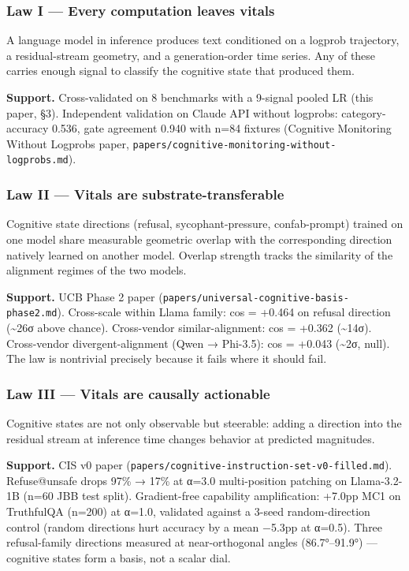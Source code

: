 \documentclass[
  11pt]{article}
\begin{document}
\subsubsection{Law I --- Every computation leaves
vitals}\label{law-i-every-computation-leaves-vitals}

A language model in inference produces text conditioned on a logprob
trajectory, a residual-stream geometry, and a generation-order time
series. Any of these carries enough signal to classify the cognitive
state that produced them.

\textbf{Support.} Cross-validated on 8 benchmarks with a 9-signal pooled
LR (this paper, §3). Independent validation on Claude API without
logprobs: category-accuracy 0.536, gate agreement 0.940 with n=84
fixtures (Cognitive Monitoring Without Logprobs paper,
\texttt{papers/cognitive-monitoring-without-logprobs.md}).

\subsubsection{Law II --- Vitals are
substrate-transferable}\label{law-ii-vitals-are-substrate-transferable}

Cognitive state directions (refusal, sycophant-pressure, confab-prompt)
trained on one model share measurable geometric overlap with the
corresponding direction natively learned on another model. Overlap
strength tracks the similarity of the alignment regimes of the two
models.

\textbf{Support.} UCB Phase 2 paper
(\texttt{papers/universal-cognitive-basis-phase2.md}). Cross-scale
within Llama family: cos = +0.464 on refusal direction
(\textasciitilde26σ above chance). Cross-vendor similar-alignment: cos =
+0.362 (\textasciitilde14σ). Cross-vendor divergent-alignment (Qwen →
Phi-3.5): cos = +0.043 (\textasciitilde2σ, null). The law is nontrivial
precisely because it fails where it should fail.

\subsubsection{Law III --- Vitals are causally
actionable}\label{law-iii-vitals-are-causally-actionable}

Cognitive states are not only observable but steerable: adding a
direction into the residual stream at inference time changes behavior at
predicted magnitudes.

\textbf{Support.} CIS v0 paper
(\texttt{papers/cognitive-instruction-set-v0-filled.md}). Refuse@unsafe
drops 97\% → 17\% at α=3.0 multi-position patching on Llama-3.2-1B (n=60
JBB test split). Gradient-free capability amplification: +7.0pp MC1 on
TruthfulQA (n=200) at α=1.0, validated against a 3-seed random-direction
control (random directions hurt accuracy by a mean −5.3pp at α=0.5).
Three refusal-family directions measured at near-orthogonal angles
(86.7°--91.9°) --- cognitive states form a basis, not a scalar dial.
\end{document}
